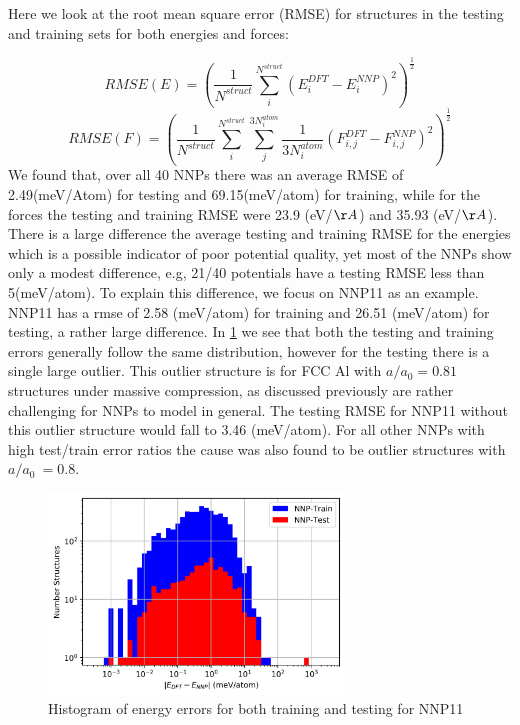 \documentclass{article}
\begin{document}
Here we look at the root mean square error (RMSE) for structures in the testing and training sets for both energies and forces:

\begin{equation}
    RMSE(E) = (\frac{1}{N^{struct}}\sum_i^{N^{struct}} (E^{DFT}_i - E^{NNP}_i)^2)^\frac{1}{2}
\end{equation}
\begin{equation}
        RMSE(F) = (\frac{1}{N^{struct}}\sum_i^{N^{struct}}\sum_j^{3N^{atom}_i}\frac{1}{3N^{atom}_i} (F^{DFT}_{i,j} - F^{NNP}_{i,j})^2)^\frac{1}{2}
\end{equation}
We found that, over all 40 NNPs there was an average RMSE of 2.49(meV/Atom) for testing and 69.15(meV/atom) for training, while for the forces the testing and training RMSE were 23.9 (eV/$\AA$) and 35.93 (eV/$\AA$).
There is a large difference the average testing and training RMSE for the energies which is a possible indicator of poor potential quality, yet most of the NNPs show only a modest difference, e.g, 21/40 potentials have a testing RMSE less than 5(meV/atom). 
To explain this difference, we focus on NNP11 as an example. 
NNP11 has a rmse of 2.58 (meV/atom) for training and 26.51 (meV/atom) for testing, a rather large difference. 
In \ref{fig:rmse_histogram} we see that both the testing and training errors generally follow the same distribution, however for the testing there is a single large outlier. 
This outlier structure is for FCC Al with $a/a_0 =0.81$ structures under massive compression, as discussed previously are rather challenging for NNPs to model in general. 
The testing RMSE for NNP11 without this outlier structure would fall to 3.46 (meV/atom).
For all other NNPs with high test/train error ratios the cause was also found to be outlier structures with
$a/a_0 ~= 0.8$. 

\begin{figure}[H]
\centering%
\includegraphics[width=0.7\textwidth,center]{figures/plot_nnperrors_histogram.png}%
\caption{Histogram of energy errors for both training and testing for NNP11}%
\label{fig:rmse_histogram}
\end{figure}
\end{document}
